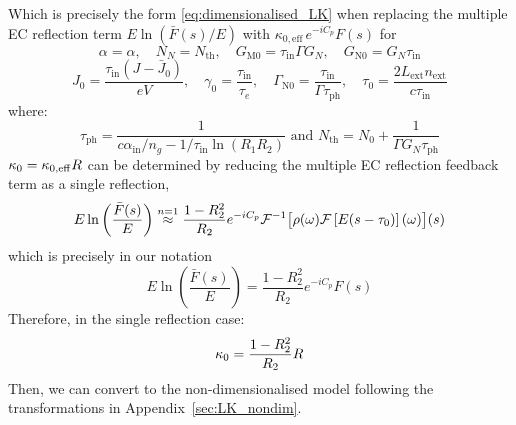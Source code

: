 %
Which is precisely the form \eqref{eq:dimensionalised_LK} when replacing the multiple EC reflection term $E \ln \left( \bar{F}(s) / E \right)$ with $\kappa_{0,\mathrm{eff}} \, e^{-i C_p} F(s)$ for
%
\[ \alpha = \alpha , \quad N_N = N_{\text{th}}, \quad G_\text{M0} = \tau_\text{in} \Gamma G_N, \quad G_\text{N0} = G_N \tau_\text{in} 
\]
\[
J_0 = \frac{\tau_\text{in}(J-\bar{J}_0)}{e V}, \quad \gamma_0 = \frac{\tau_\text{in}}{\tau_e}, \quad \Gamma_\text{N0} = \frac{\tau_\text{in}}{\Gamma \tau_\text{ph}}, \quad \tau_0 = \frac{2 L_\text{ext} n_\text{ext}}{c \tau_\text{in}} 
\]
%
where:
%
\begin{equation*}
\tau_\text{ph}=\frac{1}{c \alpha_\text{in} / n_g - 1 / \tau_\text{in} \ln \left(R_1 R_2\right)} \text{ and } N_{\text{th}} = N_0+\frac{1}{\Gamma G_N \tau_\text{ph}} 
\end{equation*}
%
$\kappa_0 = \kappa_{0,\mathrm{eff}} R$ can be determined by reducing the multiple EC reflection feedback term as a single reflection,
%
\begin{equation*}
E \ln \left( \frac{\bar{F}(s)}{E} \right) \overset{n=1}{\approx} \frac{1-R_2^2}{R_2}e^{-iC_p} \mathcal{F}^{-1}\big[ \rho(\omega) \mathcal{F}\left[ E(s-\tau_0) \right](\omega) \big](s)
\end{equation*}
%
which is precisely in our notation
%
\begin{equation*}
E \ln \left(\frac{\bar{F}(s)}{E}\right)=\frac{1-R_2^2}{R_2} e^{-i C_p} F(s)
\end{equation*}
%
Therefore, in the single reflection case:
%
\begin{equation*}
    \kappa_0=\frac{1-R_2^2}{R_2} R
\end{equation*}
%
Then, we can convert to the non-dimensionalised model following the transformations in Appendix~\ref{sec:LK_nondim}.
%
%

